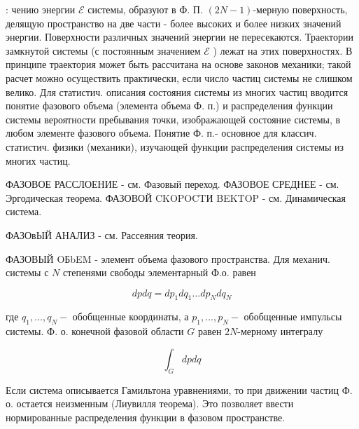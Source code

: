 \documentclass[10pt]{article}
\begin{document}
: чению энергии $\mathscr{E}$ системы, образуют в Ф. П. $(2 N-1)$-мерную поверхность, делящую пространство на две части - более высоких и более низких значений энергии. Поверхности различных значений энергии не пересекаются. Траектории замкнутой системы (с постоянным значением $\mathscr{E}$ ) лежат на этих поверхностях. В принципе траектория может быть рассчитана на основе законов механики; такой расчет можно осуществить практически, если число частиц системы не слишком велико. Для статистич. описания состояния системы из многих частиц вводится понятие фазового объема (элемента объема Ф. п.) и распределения функции системы вероятности пребывания точки, изображающей состояние системы, в любом элементе фазового объема. Понятие Ф. п.- основное для классич. статистич. физики (механики), изучающей функции распределения системы из многих частиц.



ФАЗОВОЕ РАССЛОЕНИЕ - см. Фазовый переход. ФАЗОВОЕ СРЕДНЕЕ - см. Эргодическая теорема. ФАЗОВОЙ CKOPOCTИ BEKTOP - см. Динамическая система.



ФАЗОвЫЙ АНАЛИЗ - см. Рассеяния теория.



ФАЗОВЫЙ OБbEM - элемент объема фазового пространства. Для механич. системы с $N$ степенями свободы элементарный Ф.о. равен



\[

d p d q=d p_{1} d q_{1} \ldots d p_{N} d q_{N}

\]



где $q_{1}, \ldots, q_{N}-$ обобщенные координаты, а $p_{1}, \ldots, p_{N}-$ обобщенные импульсы системы. Ф. о. конечной фазовой области $G$ равен $2 N$-мерному интегралу



\[

\int_{G} d p d q

\]



Если система описывается Гамильтона уравнениями, то при движении частиц Ф. о. остается неизменным (Лиувилля теорема). Это позволяет ввести нормированные распределения функции в фазовом пространстве.
\end{document}
